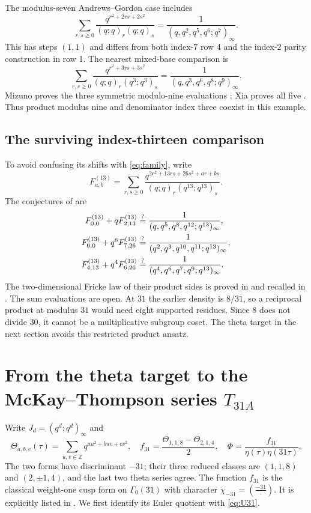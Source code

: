 \documentclass[11pt,reqno]{amsart}
\newcommand{\ZZ}{\mathbb Z}
\theoremstyle{remark}
\numberwithin{equation}{section}
\begin{document}
The modulus-seven Andrews--Gordon case \cite{Andrews,Warnaar} includes
\begin{equation}\label{eq:AGseven}
 \sum_{r,s\geq0}\frac{q^{r^2+2rs+2s^2}}{(q;q)_r(q;q)_s}
 =\frac1{(q,q^2,q^5,q^6;q^7)_\infty}.
\end{equation}
This has steps $(1,1)$ and differs from both index-$7$ row 4 and the
index-$2$ parity construction in row 1.
The nearest mixed-base comparison is
\begin{equation}\label{eq:KRnine}
 \sum_{r,s\geq0}\frac{q^{r^2+3rs+3s^2}}{(q;q)_r(q^3;q^3)_s}
 =\frac1{(q,q^3,q^6,q^8;q^9)_\infty}.
\end{equation}
Mizuno proves the three symmetric modulo-nine evaluations
\cite{MizunoKR}; Xia proves all five \cite{Xia}. Thus product modulus
nine and denominator index three coexist in this example.

\subsection{The surviving index-thirteen comparison}
To avoid confusing its shifts with \eqref{eq:family}, write
\[
 F^{(13)}_{a,b}=\sum_{r,s\geq0}
 \frac{q^{2r^2+13rs+26s^2+ar+bs}}{(q;q)_r(q^{13};q^{13})_s}.
\]
The conjectures of \cite[Conjecture~6.1]{Brown} are
\begin{align}
 F^{(13)}_{0,0}+qF^{(13)}_{2,13}
 &\stackrel?=\frac1{(q,q^5,q^8,q^{12};q^{13})_\infty},\notag\\
 F^{(13)}_{0,0}+q^6F^{(13)}_{7,26}
 &\stackrel?=\frac1{(q^2,q^3,q^{10},q^{11};q^{13})_\infty},\label{eq:thirteen}\\
 F^{(13)}_{4,13}+q^4F^{(13)}_{6,26}
 &\stackrel?=\frac1{(q^4,q^6,q^7,q^9;q^{13})_\infty}.\notag
\end{align}
The two-dimensional Fricke law of their product sides is proved in
\cite{Fricke} and recalled in \cite{Brown}. The sum evaluations are
open. At $31$ the earlier density is $8/31$, so a reciprocal product
at modulus $31$ would need eight supported residues. Since $8$ does not
divide $30$, it cannot be a multiplicative subgroup coset. The theta
target in the next section avoids this restricted product ansatz.

\section{From the theta target to the McKay--Thompson series \texorpdfstring{$T_{31A}$}{T31A}}
\label{sec:target}
Write $J_d=(q^d;q^d)_\infty$ and
\begin{equation}\label{eq:theta-target}
 \Theta_{a,b,c}(\tau)=\sum_{u,v\in\ZZ}q^{au^2+buv+cv^2},\quad
 f_{31}=\frac{\Theta_{1,1,8}-\Theta_{2,1,4}}2,\quad
 \Phi=\frac{f_{31}}{\eta(\tau)\eta(31\tau)}.
\end{equation}
The two forms have discriminant $-31$; their three reduced classes
are $(1,1,8)$ and $(2,\pm1,4)$, and the last two theta series agree.
The function $f_{31}$ is the classical weight-one cusp form on
$\Gamma_0(31)$ with character $\chi_{-31}=(\frac{-31}{\cdot})$.
It is explicitly listed in \cite[Theorem~1.1 and the class-number-three
table]{AT}. We first identify its Euler quotient with \eqref{eq:U31}.
\end{document}
